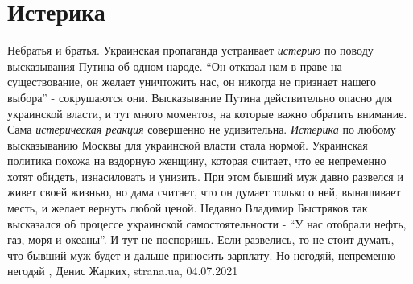  
 
 
 
 
\chapter{Истерика}

Небратья и братья.
Украинская пропаганда устраивает \emph{истерию} по поводу высказывания Путина об одном
народе. \enquote{Он отказал нам в праве на существование, он желает уничтожить нас, он
никогда не признает нашего выбора} - сокрушаются они. Высказывание Путина
действительно опасно для украинской власти, и тут много моментов, на которые
важно обратить внимание.
Сама \emph{истерическая реакция} совершенно не удивительна. \emph{Истерика} по любому
высказыванию Москвы для украинской власти стала нормой. Украинская политика
похожа на вздорную женщину, которая считает, что ее непременно хотят обидеть,
изнасиловать и унизить. При этом бывший муж давно развелся и живет своей
жизнью, но дама считает, что он думает только о ней, вынашивает месть, и желает
вернуть любой ценой. Недавно Владимир Быстряков так высказался об процессе
украинской самостоятельности - \enquote{У нас отобрали нефть, газ, моря и океаны}. И
тут не поспоришь. Если развелись, то не стоит думать, что бывший муж будет и
дальше приносить зарплату. Но негодяй, непременно негодяй
, 
Денис Жарких, strana.ua, 04.07.2021


